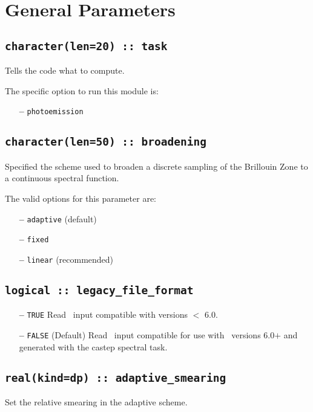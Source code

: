 \documentclass[a4paper,11pt,twoside]{book}
\begin{document}
\clearpage


\section{General Parameters}
\subsection[task]{\tt character(len=20) :: task}

Tells the code what to compute. 

The specific option to run this module is:
\begin{itemize}
\item[{\bf --}]  \verb#photoemission#

\end{itemize}


\subsection[broadening]{\tt character(len=50) :: broadening}

Specified the scheme used to broaden a discrete sampling of the
Brillouin Zone to a continuous spectral function.

The valid options for this parameter are:
\begin{itemize}
\item[{\bf --}]  \verb#adaptive# (default)
\item[{\bf --}]  \verb#fixed#
\item[{\bf --}]  \verb#linear# (recommended)
\end{itemize}

\subsection[adaptive\_smearing]{\tt logical :: legacy\_file\_format}
\label{sect:lff}
\begin{itemize}
\item[{\bf --}] \verb#TRUE#  Read \castep\ input compatible with versions $<$ 6.0.
\item[{\bf --}] \verb#FALSE# (Default) Read \castep\ input compatible for use with \castep\ versions 6.0$+$ and generated with the castep spectral task.
\end{itemize}

\subsection[adaptive\_smearing]{\tt real(kind=dp) :: adaptive\_smearing}
Set the relative smearing in the adaptive scheme.
\end{document}

